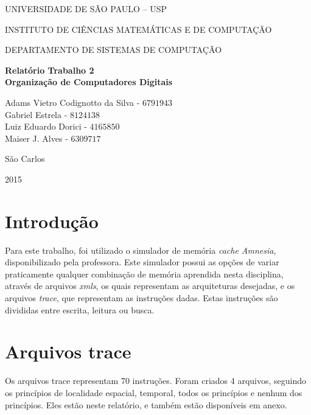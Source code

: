 \documentclass[10pt,a4paper]{article}
\newcommand*\NewPage{\newpage\null\thispagestyle{empty}\newpage}
\begin{document}
\thispagestyle{empty}
\begin{center}
	UNIVERSIDADE DE SÃO PAULO – USP
	
	INSTITUTO DE CIÊNCIAS MATEMÁTICAS E DE COMPUTAÇÃO
	
	DEPARTAMENTO DE SISTEMAS DE COMPUTAÇÃO
	
	\vspace{7cm}
	
	\Large{\textbf{Relatório Trabalho 2}}\\
	\small{\textbf{Organização de Computadores Digitais}}
	
	\vspace{6cm}
	
	Adams Vietro Codignotto da Silva - $6791943$ \\ 
	Gabriel Estrela - $8124138$\\
	Luiz Eduardo Dorici - $4165850$ \\
	Maiser J. Alves	- $6309717$\\
	
	
	
	\vspace{6cm}
	
	São Carlos
	
	2015
\end{center}

\NewPage
{}

\tableofcontents

\newpage

\section{Introdução}
Para este trabalho, foi utilizado o simulador de memória \textit{cache Amnesia}, disponibilizado pela professora. Este simulador possui as opções de variar praticamente qualquer combinação de memória aprendida nesta disciplina, através de arquivos \textit{xmls}, os quais representam  as arquiteturas desejadas, e os arquivos \textit{trace}, que representam as instruções dadas. Estas instruções são divididas entre escrita, leitura ou busca.

\section{Arquivos trace}
Os arquivos trace representam 70 instruções. Foram criados 4 arquivos, seguindo os princípios de localidade espacial, temporal, todos os princípios e nenhum dos princípios. Eles estão neste relatório, e também estão disponíveis em anexo.
\end{document}
